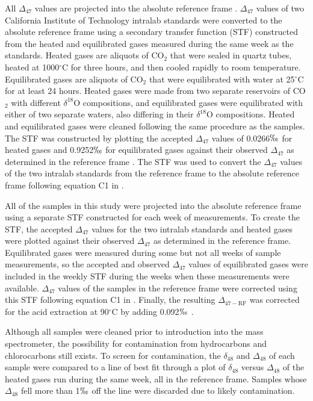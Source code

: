 \documentclass[5p, authoryear]{elsarticle}
\begin{document}
All $\Delta_{47}$ values are projected into the absolute reference frame \citep{Dennis2011}. $\Delta_{47}$ values of two California Institute of Technology intralab standards were converted to the absolute reference frame using a secondary transfer function (STF) constructed from the heated and equilibrated gases measured during the same week as the standards. Heated gases are aliquots of CO$_2$ that were sealed in quartz tubes, heated at 1000$^{\circ}$C for three hours, and then cooled rapidly to room temperature. Equilibrated gases are aliquots of CO$_2$ that were equilibrated with water at 25$^{\circ}$C for at least 24 hours. Heated gases were made from two separate reservoirs of CO$_2$ with different $\delta^{18}$O compositions, and equilibrated gases were equilibrated with either of two separate waters, also differing in their $\delta^{18}$O compositions. Heated and equilibrated gases were cleaned following the same procedure as the samples. The STF was constructed by plotting the accepted $\Delta_{47}$ values of 0.0266$\permil$ for heated gases and 0.9252$\permil$ for equilibrated gases against their observed $\Delta_{47}$ as determined in the \cite{Ghosh2006} reference frame \citep{Dennis2011}. The STF was used to convert the $\Delta_{47}$ values of the two intralab standards from the \cite{Ghosh2006} reference frame to the absolute reference frame following equation C1 in \cite{Dennis2011}. 

All of the samples in this study were projected into the absolute reference frame using a separate STF constructed for each week of measurements. To create the STF, the accepted $\Delta_{47}$ values for the two intralab standards and heated gases were plotted against their observed $\Delta_{47}$ as determined in the \cite{Ghosh2006} reference frame. Equilibrated gases were measured during some but not all weeks of sample measurements, so the accepted and observed $\Delta_{47}$ values of equilibrated gases were included in the weekly STF during the weeks when these measurements were available. $\Delta_{47}$ values of the samples in the \cite{Ghosh2006} reference frame were corrected using this STF following equation C1 in \cite{Dennis2011}. Finally, the resulting $\Delta_{47-\text{RF}}$ was corrected for the acid extraction at 90$^{\circ}$C by adding 0.092$\permil$ \citep{Henkes2013}.

Although all samples were cleaned prior to introduction into the mass spectrometer, the possibility for contamination from hydrocarbons and chlorocarbons still exists. To screen for contamination, the $\delta_{48}$ and $\Delta_{48}$ of each sample were compared to a line of best fit through a plot of $\delta_{48}$ versus $\Delta_{48}$ of the heated gases run during the same week, all in the \cite{Ghosh2006} reference frame. Samples whose $\Delta_{48}$ fell more than 1$\permil$ off the line were discarded due to likely contamination. 
\end{document}
